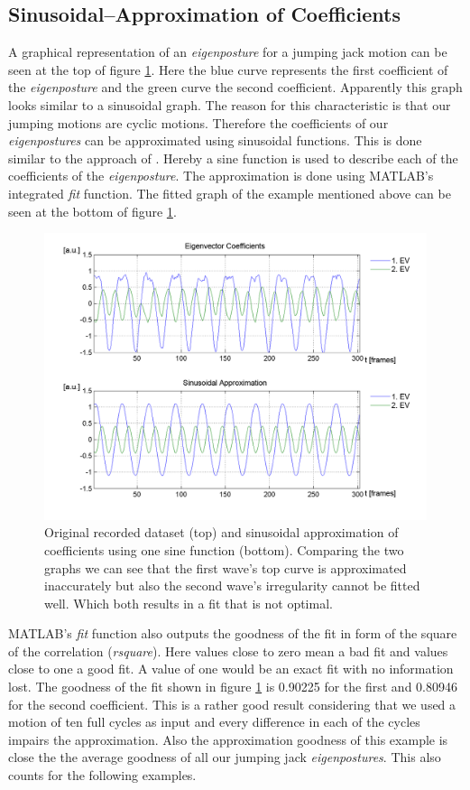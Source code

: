 \documentclass[a4paper]{article}
\begin{document}
\subsection{Sinusoidal--Approximation of Coefficients}
A graphical representation of an \emph{eigenposture} for a jumping jack motion can be seen at the top of figure \ref{fig:approx}.
Here the blue curve represents the first coefficient of the \emph{eigenposture} and the green curve the second coefficient.
Apparently this graph looks similar to a sinusoidal graph.
The reason for this characteristic is that our jumping motions are cyclic motions.
Therefore the coefficients of our \emph{eigenpostures} can be approximated using sinusoidal functions.
This is done similar to the approach of \cite{origin}.
Hereby a sine function is used to describe each of the coefficients of the \emph{eigenposture}.
The approximation is done using MATLAB's integrated \emph{fit} function.
The fitted graph of the example mentioned above can be seen at the bottom of figure \ref{fig:approx}.

\begin{figure}
		\centering
		\includegraphics[width=\textwidth]{1sinHamp.png}
		\caption{Original recorded dataset (top) and sinusoidal approximation of coefficients using one sine function (bottom).
		Comparing the two graphs we can see that the first wave's top curve is approximated inaccurately but also the second wave's irregularity cannot be fitted well.
		Which both results in a fit that is not optimal.}
		\label{fig:approx}
\end{figure}

MATLAB's \emph{fit} function also outputs the goodness of the fit in form of the square of the correlation (\emph{rsquare}).
Here values close to zero mean a bad fit and values close to one a good fit.
A value of one would be an exact fit with no information lost.
The goodness of the fit shown in figure \ref{fig:approx} is 0.90225 for the first and 0.80946 for the second coefficient.
This is a rather good result considering that we used a motion of ten full cycles as input and every difference in each of the cycles impairs the approximation.
Also the approximation goodness of this example is close the the average goodness of all our jumping jack \emph{eigenpostures}.
This also counts for the following examples.
\end{document}
